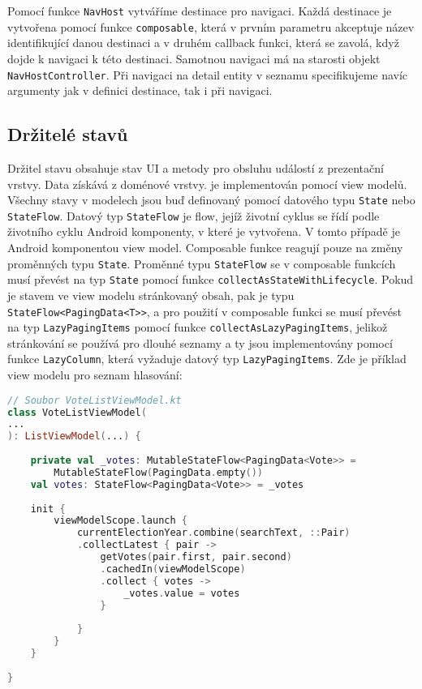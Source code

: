 \noindent Pomocí funkce \lstinline|NavHost| vytváříme destinace pro navigaci. Každá destinace je vytvořena pomocí funkce \lstinline|composable|, která v prvním parametru akceptuje název identifikující danou destinaci \linebreak a v druhém callback funkci, která se zavolá,  když dojde k navigaci k této destinaci. Samotnou navigaci má na starosti objekt \lstinline|NavHostController|. Při navigaci na detail entity v seznamu specifikujeme navíc argumenty jak v definici destinace, tak i při navigaci.

\subsection*{Držitelé stavů}
Držitel stavu obsahuje stav UI a metody pro obsluhu událostí z prezentační vrstvy. Data získává z doménové vrstvy. je implementován pomocí view modelů. Všechny stavy v modelech jsou buď definovaný pomocí datového typu \lstinline|State| nebo \lstinline|StateFlow|. Datový typ \lstinline|StateFlow| je \linebreak flow, jejíž životní cyklus se řídí podle životního cyklu Android komponenty, v které je vytvořena. \linebreak V tomto případě je Android komponentou view model. Composable funkce reagují pouze na změny proměnných typu \lstinline|State|. Proměnné typu \lstinline|StateFlow| se v composable funkcích musí převést na typ \lstinline|State| pomocí funkce \lstinline|collectAsStateWithLifecycle|. Pokud je stavem ve view modelu stránkovaný obsah, pak je typu \lstinline|StateFlow<PagingData<T>>|, a pro použití v composable funkci se musí převést na typ \lstinline|LazyPagingItems| pomocí funkce \lstinline|collectAsLazyPagingItems|, jelikož stránkování se používá pro dlouhé seznamy a ty jsou implementovány pomocí funkce \lstinline|LazyColumn|, která vyžaduje datový typ \lstinline|LazyPagingItems|. Zde je příklad view modelu pro seznam hlasování:

\begin{lstlisting}[caption={Ukázka využití view modelu}, label={lst:view-model}, tabsize=2, language=Kotlin]
// Soubor VoteListViewModel.kt
class VoteListViewModel(
...
): ListViewModel(...) {
	
	private val _votes: MutableStateFlow<PagingData<Vote>> =
		MutableStateFlow(PagingData.empty())
	val votes: StateFlow<PagingData<Vote>> = _votes
	
	init {
		viewModelScope.launch {
			currentElectionYear.combine(searchText, ::Pair)
			.collectLatest { pair ->
				getVotes(pair.first, pair.second)
				.cachedIn(viewModelScope)
				.collect { votes ->
					_votes.value = votes
				}
				
			}
		}
	}
	
}
\end{lstlisting}

